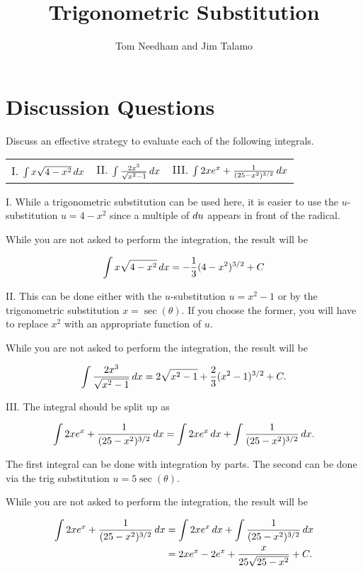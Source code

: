 \documentclass[noauthor]{ximera}
\author{Tom Needham and Jim Talamo}
\title[]{Trigonometric Substitution}
\begin{document}
\begin{abstract}
\end{abstract}
\maketitle

\vspace{-0.45in}

\section{Discussion Questions}

\begin{problem}
Discuss an effective strategy to evaluate each of the following integrals.

\begin{tabular}{lll}
I. $\int x\sqrt{4-x^2} \mathop{}\!d x$ \hspace{5mm} & II. $\int \frac{2x^3}{\sqrt{x^2-1}}  \mathop{}\!d x$ \hspace{5mm} & III. $\int 2xe^{x}+\frac{1}{(25-x^2)^{3/2}} \mathop{}\!d x$ 
\end{tabular}

\end{problem}

\begin{freeResponse}

I. While a trigonometric substitution can be used here, it is easier to use the $u$-substitution $u=4-x^2$ since a multiple of $\mathop{}\!d u$ appears in front of the radical.

While you are not asked to perform the integration, the result will be

\[
\int x\sqrt{4-x^2} \mathop{}\!d x = -\frac{1}{3}(4-x^2)^{3/2}+C
\]

II. This can be done either with the $u$-substitution $u= x^2-1$ or by the trigonometric substitution $x=\sec(\theta)$.  If you choose the former, you will have to replace $x^2$ with an appropriate function of $u$.

While you are not asked to perform the integration, the result will be

\[
\int  \frac{2x^3}{\sqrt{x^2-1}} \mathop{}\!d x = 2\sqrt{x^2-1}+\frac{2}{3}(x^2-1)^{3/2}+C.
\]

III. The integral should be split up as

\[
\int 2xe^{x}+\frac{1}{(25-x^2)^{3/2}} \mathop{}\!d x = \int 2xe^{x} \mathop{}\!d x+ \int \frac{1}{(25-x^2)^{3/2}} \mathop{}\!d x.
\]

The first integral can be done with integration by parts.  The second can be done via the trig substitution $u=5 \sec(\theta)$.

While you are not asked to perform the integration, the result will be

\begin{align*}
\int 2xe^{x}+\frac{1}{(25-x^2)^{3/2}} \mathop{}\!d x &= \int 2xe^{x} \mathop{}\!d x+ \int \frac{1}{(25-x^2)^{3/2}} \mathop{}\!d x \\
&= 2xe^x-2e^x+\frac{x}{25\sqrt{25-x^2}} +C.
\end{align*}

\end{freeResponse}
\end{document}
